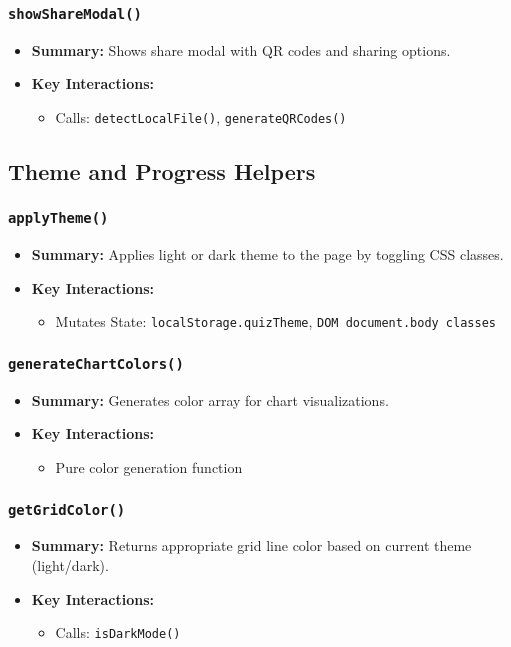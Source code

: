 \documentclass[11pt,letterpaper]{article}
\begin{document}
\subsubsection{\texttt{showShareModal()}}
\begin{itemize}
    \item \textbf{Summary:} Shows share modal with QR codes and sharing options.
    \item \textbf{Key Interactions:}
    \begin{itemize}
        \item Calls: \texttt{detectLocalFile()}, \texttt{generateQRCodes()}
    \end{itemize}
\end{itemize}

\subsection{Theme and Progress Helpers}

\subsubsection{\texttt{applyTheme()}}
\begin{itemize}
    \item \textbf{Summary:} Applies light or dark theme to the page by toggling CSS classes.
    \item \textbf{Key Interactions:}
    \begin{itemize}
        \item Mutates State: \texttt{localStorage.quizTheme}, \texttt{DOM document.body classes}
    \end{itemize}
\end{itemize}

\subsubsection{\texttt{generateChartColors()}}
\begin{itemize}
    \item \textbf{Summary:} Generates color array for chart visualizations.
    \item \textbf{Key Interactions:}
    \begin{itemize}
        \item Pure color generation function
    \end{itemize}
\end{itemize}

\subsubsection{\texttt{getGridColor()}}
\begin{itemize}
    \item \textbf{Summary:} Returns appropriate grid line color based on current theme (light/dark).
    \item \textbf{Key Interactions:}
    \begin{itemize}
        \item Calls: \texttt{isDarkMode()}
    \end{itemize}
\end{itemize}
\end{document}
